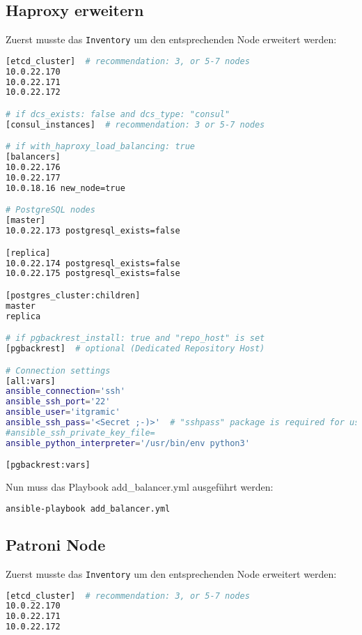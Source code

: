 \begin{flushleft}
    \subsection{Haproxy erweitern}
    Zuerst musste das \texttt{Inventory} um den entsprechenden Node erweitert werden:
    \lstset{style=gra_codestyle}
    \begin{lstlisting}[language=bash, caption=Testsystem - Anhang - add\_balancer.yml - inventory,captionpos=b,label={lst:testsystem-add-balancer-inventory},breaklines=true]
[etcd_cluster]  # recommendation: 3, or 5-7 nodes
10.0.22.170
10.0.22.171
10.0.22.172

# if dcs_exists: false and dcs_type: "consul"
[consul_instances]  # recommendation: 3 or 5-7 nodes

# if with_haproxy_load_balancing: true
[balancers]
10.0.22.176
10.0.22.177
10.0.18.16 new_node=true

# PostgreSQL nodes
[master]
10.0.22.173 postgresql_exists=false

[replica]
10.0.22.174 postgresql_exists=false
10.0.22.175 postgresql_exists=false

[postgres_cluster:children]
master
replica

# if pgbackrest_install: true and "repo_host" is set
[pgbackrest]  # optional (Dedicated Repository Host)

# Connection settings
[all:vars]
ansible_connection='ssh'
ansible_ssh_port='22'
ansible_user='itgramic'
ansible_ssh_pass='<Secret ;-)>'  # "sshpass" package is required for use "ansible_ssh_pass"
#ansible_ssh_private_key_file=
ansible_python_interpreter='/usr/bin/env python3'

[pgbackrest:vars]

    \end{lstlisting}
    Nun muss das Playbook add\_balancer.yml ausgeführt werden:
    \lstset{style=gra_codestyle}
    \begin{lstlisting}[language=bash, caption=Testsystem - Anhang - add\_balancer.yml,captionpos=b,label={lst:add-appendix-balancer},breaklines=true]
ansible-playbook add_balancer.yml
    \end{lstlisting}
    \subsection{Patroni Node}
    Zuerst musste das \texttt{Inventory} um den entsprechenden Node erweitert werden:
    \lstset{style=gra_codestyle}
    \begin{lstlisting}[language=bash, caption=Testsystem - Anhang - add\_pgnode.yml - inventory,captionpos=b,label={lst:testsystem-add-pgnode-inventory},breaklines=true]
[etcd_cluster]  # recommendation: 3, or 5-7 nodes
10.0.22.170
10.0.22.171
10.0.22.172


\end{lstlisting}
\end{flushleft}
